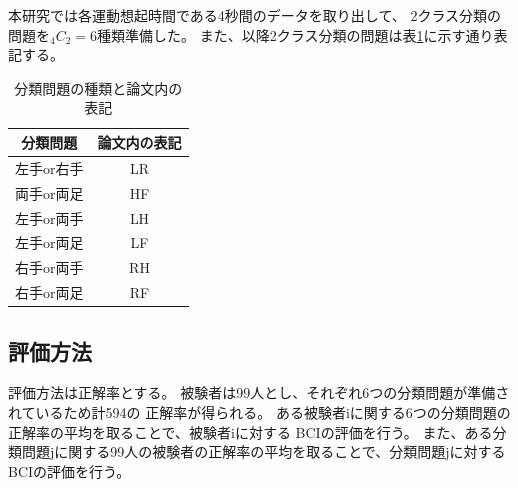 本研究では各運動想起時間である4秒間のデータを取り出して、
2クラス分類の問題を\(_4C_2=6\)種類準備した。
また、以降2クラス分類の問題は表\ref{table:pattern}に示す通り表記する。
\begin{table}[t]
    \centering
    \caption{分類問題の種類と論文内の表記}
    \begin{tabular}{|c|c|} \hline
        分類問題 & 論文内の表記 \\ \hline
        左手or右手 & LR \\ \hline
        両手or両足 & HF \\ \hline
        左手or両手 & LH \\ \hline
        左手or両足 & LF \\ \hline
        右手or両手 & RH \\ \hline
        右手or両足 & RF \\ \hline
    \end{tabular}
    \label{table:pattern}
\end{table}

\subsection{評価方法}
評価方法は正解率とする。
被験者は99人とし、それぞれ6つの分類問題が準備されているため計594の
正解率が得られる。
ある被験者iに関する6つの分類問題の正解率の平均を取ることで、被験者iに対する
BCIの評価を行う。
また、ある分類問題jに関する99人の被験者の正解率の平均を取ることで、分類問題jに対する
BCIの評価を行う。